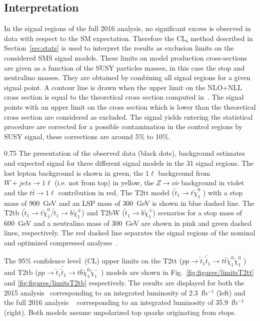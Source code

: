 \subsection{Interpretation}

In the signal regions of the full 2016 analysis, no significant excess is observed in data with respect to the SM expectation.  Therefore the $\mathrm{CL_{s}}$ method described in Section~\ref{sec:stats} is used to interpret the results as exclusion limits on the considered SMS signal models. These limits on model production cross-sections are given as a function of the SUSY particles masses, in this case the stop and neutralino masses. They are obtained by combining all signal regions for a given signal point. A contour line is drawn when the upper limit on the NLO+NLL cross section is equal to the theoretical cross section computed in~\cite{Borschensky:2014cia}. The signal points with an upper limit on the cross section which is lower than the theoretical cross section are considered as excluded. The signal yields entering the statistical procedure are corrected for a possible contamination in the control regions by SUSY signal, these corrections are around 5\% to 10\%.



                 {0.75}       %
                 { The presentation of the observed data (black dots), background estimates and expected signal for three different signal models in the 31 signal regions. The lost lepton background is shown in green, the $1 \ell$ background from $W+jets \to 1\ell$ (i.e. not from top) in yellow, the $Z \to \nu \bar{\nu}$ background in violet and the $t\bar{t} \to 1\ell$ contribution in red. The T2tt model ($\tilde{t}_{1} \to t \tilde{\chi}^{0}_{1}$ ) with a stop mass of 900~GeV and an LSP mass of 300~GeV is shown in blue dashed line. The T2tb ($\tilde{t}_{1} \to t \tilde{\chi}^{0}_{1} /\tilde{t}_{1} \to b \tilde{\chi}^{\pm}_{1}$) and T2bW ($\tilde{t}_{1} \to b \tilde{\chi}^{\pm}_{1}$) scenarios for a stop mass of 600~GeV and a neutralino mass of 300~GeV are shown in pink and green dashed lines, respectively. The red dashed line separates the signal regions of the nominal and optimized compressed analyses~\cite{Sirunyan:2017xse}. }

The 95\% confidence level~(CL) upper limits  on the  T2tt ($ pp \to \tilde{t}_{1} \bar{\tilde{t}}_{1} \to t \bar{t} \tilde{\chi}^{0}_{1} \tilde{\chi}^{0}_{1}$ )  and T2tb ($ pp \to \tilde{t}_{1} \bar{\tilde{t}}_{1} \to t \bar{b} \tilde{\chi}^{0}_{1} \tilde{\chi}^{-}_{1}$ ) models are shown in Fig.~\ref{fig:figures/limitsT2tt} and \ref{fig:figures/limitsT2tb} respectively. The  results are displayed for both the 2015 analysis~\cite{Sirunyan:2016jpr} corresponding to an integrated luminosity of 2.3~fb$^{-1}$  (left) and the full 2016 analysis ~\cite{Sirunyan:2017xse} corresponding to an integrated luminosity of 35.9~fb$^{-1}$  (right). Both models assume unpolarized top quarks originating from stops.  

